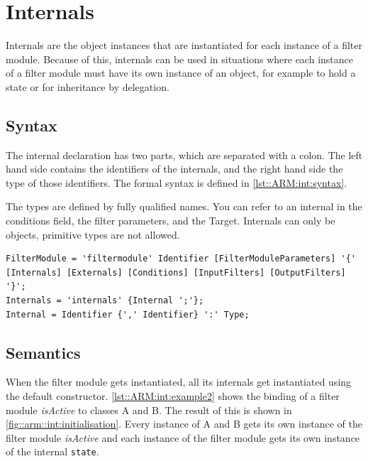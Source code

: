 %
%
%
%
\chapter{Internals}%
Internals are the object instances that are instantiated for each instance of a filter module. 
Because of this, internals can be used in situations where each instance of a filter module must have its own instance of an object, for example to hold a state or for inheritance by delegation.

\section{Syntax}
The internal declaration has two parts, which are separated with a colon. 
The left hand side contains the identifiers of the internals, and the right hand side the type of those identifiers. 
The formal syntax is defined in \autoref{lst::ARM:int:syntax}.

The types are defined by fully qualified names.
You can refer to an internal in the conditions field, the filter parameters, and the Target.
Internals can only be objects, primitive types are not allowed.
\begin{lstlisting}[caption = {Internals syntax}, label = lst::ARM:int:syntax,
style = listing, language = ebnf, float = tpb]
FilterModule = 'filtermodule' Identifier [FilterModuleParameters] '{' [Internals] [Externals] [Conditions] [InputFilters] [OutputFilters] '}';
Internals = 'internals' {Internal ';'};
Internal = Identifier {',' Identifier} ':' Type;
\end{lstlisting}

\section{Semantics}
When the filter module gets instantiated, all its internals get instantiated using the default constructor.
\autoref{lst::ARM:int:example2} shows the binding of a filter module \emph{isActive} to classes A and B. 
The result of this is shown in \autoref{fig::arm::int:initialisation}.
Every instance of A and B gets its own instance of the filter module \emph{isActive} and each instance of the filter module gets its own instance of the internal \lstinline!state!.

